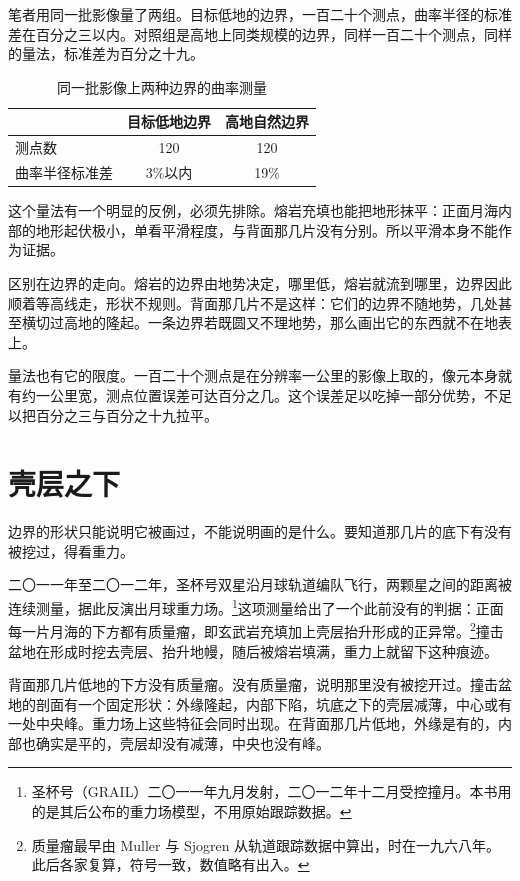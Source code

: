 笔者用同一批影像量了两组。目标低地的边界，一百二十个测点，曲率半径的标准差在百分之三以内。对照组是高地上同类规模的边界，同样一百二十个测点，同样的量法，标准差为百分之十九。

\begin{table}[htbp]
\centering
\caption{同一批影像上两种边界的曲率测量}
\begin{tabular}{@{}lcc@{}}
\toprule
 & 目标低地边界 & 高地自然边界\\
\midrule
测点数 & 120 & 120 \\
曲率半径标准差 & 3\%以内 & 19\% \\
\bottomrule
\end{tabular}
\end{table}

这个量法有一个明显的反例，必须先排除。熔岩充填也能把地形抹平：正面月海内部的地形起伏极小，单看平滑程度，与背面那几片没有分别。所以平滑本身不能作为证据。

区别在边界的走向。熔岩的边界由地势决定，哪里低，熔岩就流到哪里，边界因此顺着等高线走，形状不规则。背面那几片不是这样：它们的边界不随地势，几处甚至横切过高地的隆起。一条边界若既圆又不理地势，那么画出它的东西就不在地表上。

量法也有它的限度。一百二十个测点是在分辨率一公里的影像上取的，像元本身就有约一公里宽，测点位置误差可达百分之几。这个误差足以吃掉一部分优势，不足以把百分之三与百分之十九拉平。


\section{壳层之下}

边界的形状只能说明它被画过，不能说明画的是什么。要知道那几片的底下有没有被挖过，得看重力。

二〇一一年至二〇一二年，圣杯号双星沿月球轨道编队飞行，两颗星之间的距离被连续测量，据此反演出月球重力场。\footnote{圣杯号（GRAIL）二〇一一年九月发射，二〇一二年十二月受控撞月。本书用的是其后公布的重力场模型，不用原始跟踪数据。}这项测量给出了一个此前没有的判据：正面每一片月海的下方都有质量瘤，即玄武岩充填加上壳层抬升形成的正异常。\footnote{质量瘤最早由 Muller 与 Sjogren 从轨道跟踪数据中算出，时在一九六八年。此后各家复算，符号一致，数值略有出入。}撞击盆地在形成时挖去壳层、抬升地幔，随后被熔岩填满，重力上就留下这种痕迹。

背面那几片低地的下方没有质量瘤。没有质量瘤，说明那里没有被挖开过。撞击盆地的剖面有一个固定形状：外缘隆起，内部下陷，坑底之下的壳层减薄，中心或有一处中央峰。重力场上这些特征会同时出现。在背面那几片低地，外缘是有的，内部也确实是平的，壳层却没有减薄，中央也没有峰。

